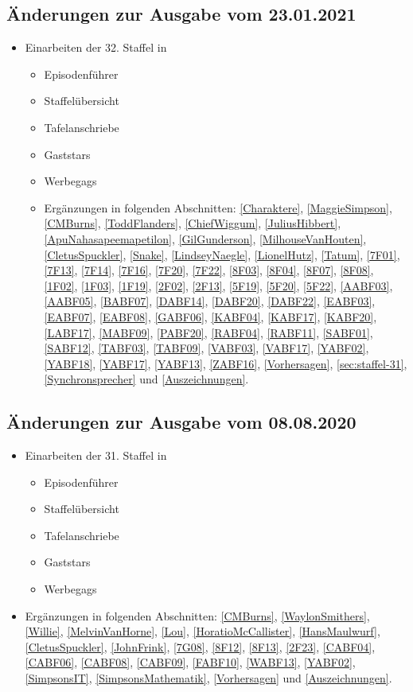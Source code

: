 \documentclass[pagesize,twoside,german]{scrbook}
\begin{document}
\subsection*{Änderungen zur Ausgabe vom 23.01.2021}
\begin{itemize}
	\item Einarbeiten der 32. Staffel in
	\begin{itemize}
		\item Episodenführer
		\item Staffelübersicht
		\item Tafelanschriebe
		\item Gaststars
		\item Werbegags
		\item Ergänzungen in folgenden Abschnitten: \ref{Charaktere}, \ref{MaggieSimpson}, \ref{CMBurns}, \ref{ToddFlanders}, \ref{ChiefWiggum}, \ref{JuliusHibbert}, \ref{ApuNahasapeemapetilon}, \ref{GilGunderson}, \ref{MilhouseVanHouten}, \ref{CletusSpuckler}, \ref{Snake}, \ref{LindseyNaegle}, \ref{LionelHutz}, \ref{Tatum}, \ref{7F01}, \ref{7F13}, \ref{7F14}, \ref{7F16}, \ref{7F20}, \ref{7F22}, \ref{8F03}, \ref{8F04}, \ref{8F07}, \ref{8F08}, \ref{1F02}, \ref{1F03}, \ref{1F19}, \ref{2F02}, \ref{2F13}, \ref{5F19}, \ref{5F20}, \ref{5F22}, \ref{AABF03}, \ref{AABF05}, \ref{BABF07}, \ref{DABF14}, \ref{DABF20}, \ref{DABF22}, \ref{EABF03}, \ref{EABF07}, \ref{EABF08}, \ref{GABF06}, \ref{KABF04}, \ref{KABF17}, \ref{KABF20}, \ref{LABF17}, \ref{MABF09}, \ref{PABF20}, \ref{RABF04}, \ref{RABF11}, \ref{SABF01}, \ref{SABF12}, \ref{TABF03}, \ref{TABF09}, \ref{VABF03}, \ref{VABF17}, \ref{YABF02}, \ref{YABF18}, \ref{YABF17}, \ref{YABF13}, \ref{ZABF16}, \ref{Vorhersagen}, \ref{sec:staffel-31}, \ref{Synchronsprecher} und \ref{Auszeichnungen}.
	\end{itemize}
\end{itemize}

\subsection*{Änderungen zur Ausgabe vom 08.08.2020}
\begin{itemize}
	\item Einarbeiten der 31. Staffel in
	\begin{itemize}
		\item Episodenführer
		\item Staffelübersicht
		\item Tafelanschriebe
		\item Gaststars
		\item Werbegags
	\end{itemize}
	\item Ergänzungen in folgenden Abschnitten: \ref{CMBurns}, \ref{WaylonSmithers}, \ref{Willie}, \ref{MelvinVanHorne}, \ref{Lou}, \ref{HoratioMcCallister}, \ref{HansMaulwurf}, \ref{CletusSpuckler}, \ref{JohnFrink}, \ref{7G08}, \ref{8F12}, \ref{8F13}, \ref{2F23}, \ref{CABF04}, \ref{CABF06}, \ref{CABF08}, \ref{CABF09}, \ref{FABF10}, \ref{WABF13}, \ref{YABF02}, \ref{SimpsonsIT}, \ref{SimpsonsMathematik}, \ref{Vorhersagen} und \ref{Auszeichnungen}.
\end{itemize}
\end{document}

